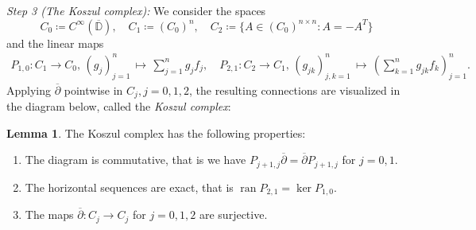 \documentclass[letterpaper, 11pt]{article}
\newcommand{\D}{\mathbb{D}}
\newcommand{\1}{\mathds{1}}
\newcommand{\wirtzbar}{\overline{\partial}}
\DeclareMathOperator*{\ran}{ran}
\theoremstyle{definition}
\newtheorem{lemma}[theorem]{Lemma}
\newenvironment{innerproof}
 {\renewcommand{\qedsymbol}{}\proof}
 {\endproof}
\begin{document}
\begin{innerproof}[Proof (continued)]
  \textit{Step 3 (The Koszul complex):} We consider the spaces
  \begin{equation*}
    C_0 \coloneqq C^\infty(\overline{\D}), \quad C_1 \coloneqq (C_0)^n, \quad C_2 \coloneqq \{ A \in (C_0)^{n \times n} : A = -A^T \}
  \end{equation*}
  and the linear maps
  \begin{align*}
    P_{1,0} : C_1 \to C_0,\, (g_j)_{j=1}^n \,\mapsto\, \sum_{j=1}^n g_j f_j, \quad P_{2,1} : C_2 \to C_1,\, (g_{jk})_{j,k=1}^n \,\mapsto\, \left( \sum_{k=1}^n g_{jk} f_k \right)_{j=1}^n.
  \end{align*}
  Applying $\wirtzbar$ pointwise in $C_j, j = 0, 1, 2$, the resulting connections are visualized in the diagram below, called the \emph{Koszul complex}:
  \begin{center}
  \end{center}
\end{innerproof}

\begin{lemma} \label{lem:koszul}
  The Koszul complex has the following properties:
  \begin{enumerate}
    \item The diagram is commutative, that is we have $P_{j+1,j} \wirtzbar = \wirtzbar P_{j+1,j}$ for $j = 0,1$.
    \item The horizontal sequences are exact, that is $\ran P_{2,1} = \ker P_{1,0}$.
    \item The maps $\wirtzbar : C_j \to C_j$ for $j=0,1,2$ are surjective.
  \end{enumerate}
\end{lemma}
\end{document}
